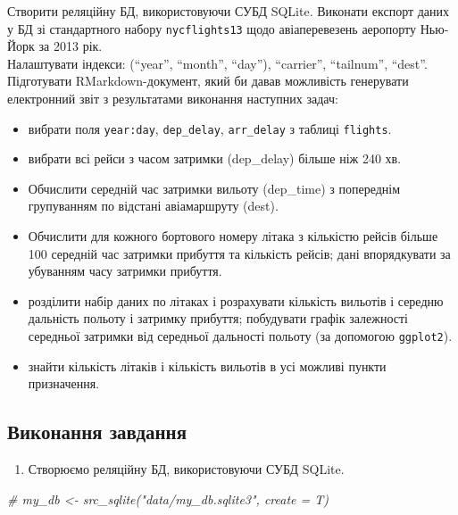 \documentclass[
]{book}
\newenvironment{Shaded}{\begin{snugshade}}{\end{snugshade}}
\newcommand{\CommentTok}[1]{\textcolor[rgb]{0.56,0.35,0.01}{\textit{#1}}}
\providecommand{\tightlist}{%
  \setlength{\itemsep}{0pt}\setlength{\parskip}{0pt}}
\begin{document}
Створити реляційну БД, використовуючи СУБД SQLite. Виконати експорт даних у БД зі стандартного набору \texttt{nycflights13} щодо авіаперевезень аеропорту Нью-Йорк за 2013 рік.\\
Налаштувати індекси: (``year'', ``month'', ``day''), ``carrier'', ``tailnum'', ``dest''.\\
Підготувати RMarkdown-документ, який би давав можливість генерувати електронний звіт з результатами виконання наступних задач:

\begin{itemize}
\tightlist
\item
  вибрати поля \texttt{year:day}, \texttt{dep\_delay}, \texttt{arr\_delay} з таблиці \texttt{flights}.
\item
  вибрати всі рейси з часом затримки (dep\_delay) більше ніж 240 хв.
\item
  Обчислити середній час затримки вильоту (dep\_time) з попереднім групуванням по відстані авіамаршруту (dest).
\item
  Обчислити для кожного бортового номеру літака з кількістю рейсів більше 100 середній час затримки прибуття та кількість рейсів; дані впорядкувати за убуванням часу затримки прибуття.
\item
  розділити набір даних по літаках і розрахувати кількість вильотів і середню дальність польоту і затримку прибуття; побудувати графік залежності середньої затримки від середньої дальності польоту (за допомогою \texttt{ggplot2}).
\item
  знайти кількість літаків і кількість вильотів в усі можливі пункти призначення.
\end{itemize}

\hypertarget{ux432ux438ux43aux43eux43dux430ux43dux43dux44f-ux437ux430ux432ux434ux430ux43dux43dux44f-1}{%
\subsection{Виконання завдання}\label{ux432ux438ux43aux43eux43dux430ux43dux43dux44f-ux437ux430ux432ux434ux430ux43dux43dux44f-1}}

\begin{enumerate}
\def\labelenumi{\arabic{enumi}.}
\tightlist
\item
  Створюємо реляційну БД, використовуючи СУБД SQLite.
\end{enumerate}

\begin{Shaded}
\begin{Highlighting}[]
\CommentTok{\# my\_db \textless{}{-} src\_sqlite("data/my\_db.sqlite3", create = T)}
\end{Highlighting}
\end{Shaded}
\end{document}

